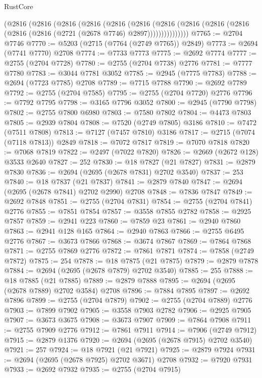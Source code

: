 \begin{lexlean}{RustCore}
\begin{coremodule}
        (@2816
          (@2816
            (@2816
              (@2816
                (@2816
                  (@2816
                    (@2816
                      (@2816 (@2816 (@2816 (@2816 (@2816 (@2721 (@2678 @7746) @2897)))))))))))))))
@7765 := @2704 @7746
@7770 := @5203 (@2715 (@7764 (@2749 @7765)) @2849)
@7773 := @2694 (@7741 @7770) @2708
@7774 := @7733 @7773
@7775 := @2692 @7774
@7777 := @2755 (@2704 @7728)
@7780 := @2755 (@2704 @7738) @2776
@7781 := @7777 @7780
@7783 := @3044 @7781 @3052
@7785 := @2945 (@7775 @7783)
@7788 := @2694 (@7723 @7785) @2708
@7789 := @7715 @7788
@7790 := @2692 @7789
@7792 := @2755 (@2704 @7585)
@7795 := @2755 (@2704 @7720) @2776
@7796 := @7792 @7795
@7798 := @3165 @7796 @3052
@7800 := @2945 (@7790 @7798)
@7802 := @2755 @7800 @6980
@7803 := @7580 @7802
@7804 := @4473 @7803
@7805 := @2939 @7804
@7808 := @7520 (@2749 @7805) @3186
@7810 := @7472 (@7511 @7808)
@7813 := @7127 (@7457 @7810) @3186
@7817 := @2715 (@7074 (@7118 @7813)) @2849
@7818 := @7072 @7817
@7819 := @7070 @7818
@7820 := @7068 @7819
@7822 := @2497 (@7022 @7820)
@7826 := @2669 (@2672 @128) @3533 @2640
@7827 := 252
@7830 := @18 @7827 (@21 @7827)
@7831 := @2879 @7830
@7836 := @2694 (@2695 (@2678 @7831) @2702 @3540)
@7837 := 253
@7840 := @18 @7837 (@21 @7837)
@7841 := @2879 @7840
@7847 := @2694 (@2695 (@2678 @7841) @2702 @2990) @2708
@7848 := @7836 @7847
@7849 := @2692 @7848
@7851 := @2755 (@2704 @7831)
@7854 := @2755 (@2704 @7841) @2776
@7855 := @7851 @7854
@7857 := @3558 @7855 @2782
@7858 := @2925 @7857
@7859 := @2941 @223
@7860 := @7859 @23
@7861 := @2940 @7860
@7863 := @2941 @128 @165
@7864 := @2940 @7863
@7866 := @2755 @6495 @2776
@7867 := @3673 @7866
@7868 := @3674 @7867
@7869 := @7864 @7868
@7871 := @2755 @7869 @2776
@7872 := @7861 @7871
@7874 := @7858 (@2749 @7872)
@7875 := 254
@7878 := @18 @7875 (@21 @7875)
@7879 := @2879 @7878
@7884 := @2694 (@2695 (@2678 @7879) @2702 @3540)
@7885 := 255
@7888 := @18 @7885 (@21 @7885)
@7889 := @2879 @7888
@7895 := @2694 (@2695 (@2678 @7889) @2702 @3584) @2708
@7896 := @7884 @7895
@7897 := @2692 @7896
@7899 := @2755 (@2704 @7879)
@7902 := @2755 (@2704 @7889) @2776
@7903 := @7899 @7902
@7905 := @3558 @7903 @2782
@7906 := @2925 @7905
@7907 := @3673 @3675
@7908 := @3673 @7907
@7909 := @7864 @7908
@7911 := @2755 @7909 @2776
@7912 := @7861 @7911
@7914 := @7906 (@2749 @7912)
@7915 := @2879 @1376
@7920 := @2694 (@2695 (@2678 @7915) @2702 @3540)
@7921 := 257
@7924 := @18 @7921 (@21 @7921)
@7925 := @2879 @7924
@7931 := @2694 (@2695 (@2678 @7925) @2702 @3671) @2708
@7932 := @7920 @7931
@7933 := @2692 @7932
@7935 := @2755 (@2704 @7915)

\end{coremodule}
\end{lexlean}
